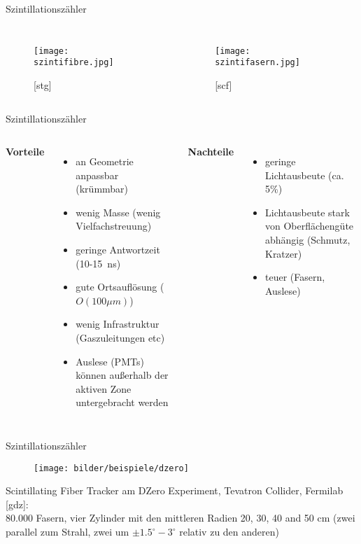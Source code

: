 \begin{frame}{Szintillationszähler}
		\begin{columns}[T]
			\begin{figure}[htbp]
			  \centering
			  \texttt{[image: szintifibre.jpg]}
			  \caption*{[stg]}
			\end{figure}
	    	\begin{figure}[htbp]
			  \centering
			  \texttt{[image: szintifasern.jpg]}
			  \caption*{[scf]}
			\end{figure}
    \end{columns}
\end{frame}
	
	\begin{frame}{Szintillationszähler}
    \begin{columns}[T]
			\textbf{Vorteile}		
			\vspace{0.7cm}
			\begin{itemize}
			  \item an Geometrie anpassbar (krümmbar)
			  \item wenig Masse (wenig Vielfachstreuung)
			  \item geringe Antwortzeit (10-15~ns)
			  \item gute Ortsauflösung ($O(100\mu m)$)
			  \item wenig Infrastruktur (Gaszuleitungen etc)
			  \item Auslese (PMTs) können außerhalb der aktiven Zone untergebracht werden
			\end{itemize}	
	    	\textbf{Nachteile}
	    	\vspace{0.7cm}
	    	\begin{itemize}
			  \item geringe Lichtausbeute (ca. 5\%)
			  \item Lichtausbeute stark von Oberflächengüte abhängig (Schmutz, Kratzer)
			  \item teuer (Fasern, Auslese)
			\end{itemize}
    \end{columns}
\end{frame}

\begin{frame}{Szintillationszähler}
			\begin{figure}[htbp]
			  \centering
			  \texttt{[image: bilder/beispiele/dzero]}
			\end{figure}
Scintillating Fiber Tracker am DZero Experiment, Tevatron Collider, Fermilab [gdz]: \\
80.000 Fasern, vier Zylinder mit den mittleren Radien 20, 30, 40 and 50 cm (zwei parallel zum
Strahl, zwei um $\pm1.5^\circ-3^\circ$ relativ zu den anderen)
\end{frame}
